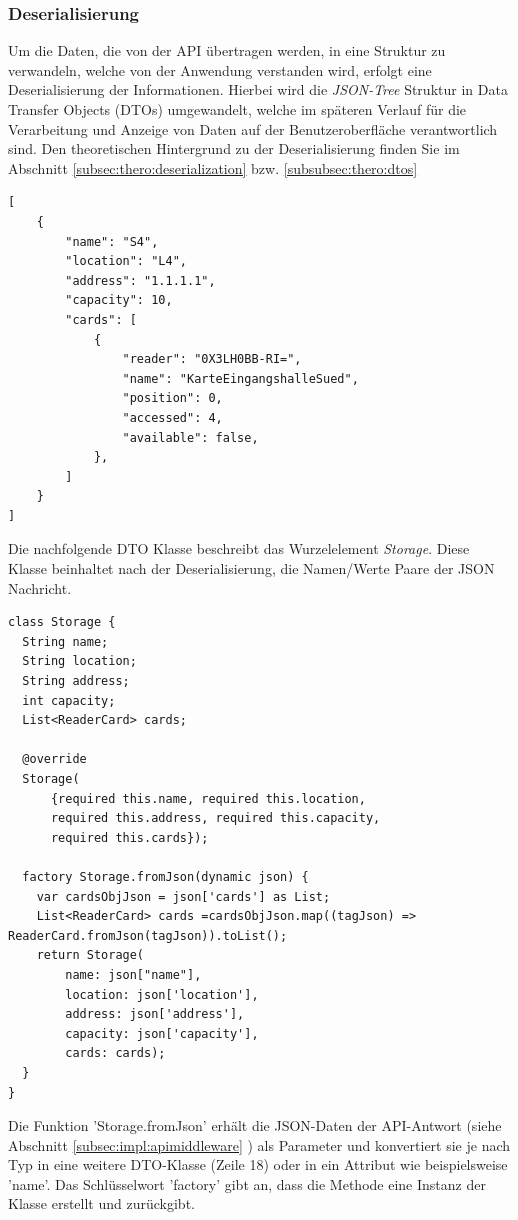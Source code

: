\subsubsection{Deserialisierung }
Um die Daten, die von der API übertragen werden, in eine Struktur zu verwandeln, welche von der Anwendung verstanden wird, erfolgt eine Deserialisierung der Informationen. Hierbei wird die {\textit{JSON-Tree}} Struktur in Data Transfer Objects (DTOs) umgewandelt, welche im späteren Verlauf für die  Verarbeitung und Anzeige von Daten auf der Benutzeroberfläche verantwortlich sind. Den theoretischen Hintergrund zu der Deserialisierung finden Sie im Abschnitt \ref{subsec:thero:deserialization}  bzw. \ref{subsubsec:thero:dtos} 
\newpage
\begin{lstlisting}[caption=\"Ubertragungsdaten eines Storages in Form von JSON,style=goMono]
[
    {
        "name": "S4",
        "location": "L4",
        "address": "1.1.1.1",
        "capacity": 10,
        "cards": [
            {
                "reader": "0X3LH0BB-RI=",
                "name": "KarteEingangshalleSued",
                "position": 0,
                "accessed": 4,
                "available": false,
            },
        ]
    }
]
\end{lstlisting}
Die nachfolgende DTO Klasse beschreibt das Wurzelelement {\textit{Storage}}. Diese Klasse beinhaltet nach der Deserialisierung, die Namen/Werte Paare der JSON Nachricht.
\begin{lstlisting}[caption=Dto Klasse Storage,style=goMono]
class Storage {
  String name;
  String location;
  String address;
  int capacity;
  List<ReaderCard> cards;

  @override
  Storage(
      {required this.name, required this.location,
      required this.address, required this.capacity,
      required this.cards});
      
  factory Storage.fromJson(dynamic json) {
    var cardsObjJson = json['cards'] as List;
    List<ReaderCard> cards =cardsObjJson.map((tagJson) => ReaderCard.fromJson(tagJson)).toList();
    return Storage(
        name: json["name"],
        location: json['location'],
        address: json['address'],
        capacity: json['capacity'],
        cards: cards);
  }
}
\end{lstlisting}
Die Funktion 'Storage.fromJson' erhält die JSON-Daten der API-Antwort (siehe Abschnitt \ref{subsec:impl:apimiddleware} ) als Parameter und konvertiert sie je nach Typ in eine weitere DTO-Klasse (Zeile 18) oder in ein Attribut wie beispielsweise 'name'. Das Schlüsselwort 'factory' gibt an, dass die Methode eine Instanz der Klasse erstellt und zurückgibt.


